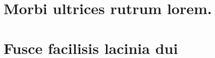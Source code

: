 \documentclass[
	12pt,				%
	openright,			%
	oneside,			%
	a4paper,			%
	english,			%
	brazil				%
	]{abntex2}
\begin{document}
\begin{anexosenv}

\partanexos

\chapter{Morbi ultrices rutrum lorem.}

\chapter{Fusce facilisis lacinia dui}

\end{anexosenv}

\printindex
\end{document}
